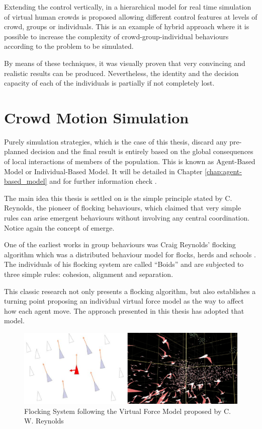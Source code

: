 Extending the control vertically, in \citep{musse2} a hierarchical model for real time simulation of virtual human crowds is proposed allowing different control features at levels of crowd, groups or individuals. This is an example of hybrid approach where it is possible to increase the complexity of crowd-group-individual behaviours according to the problem to be simulated.

By means of these techniques, it was visually proven that very convincing and realistic results can be produced. Nevertheless, the identity and the decision capacity of each of the individuals is partially if not completely lost.

\section{Crowd Motion Simulation}

Purely simulation strategies, which is the case of this thesis, discard any pre-planned decision and the final result is entirely based on the global consequences of local interactions of members of the population. This is known as Agent-Based Model or Individual-Based Model. It will be detailed in Chapter \ref{chap:agent-based_model} and for further information check  \citep{red3D}.

The main idea this thesis is settled on is the simple principle stated by C. Reynolds, the pioneer of flocking behaviours, which claimed that very simple rules can arise emergent behaviours without involving any central coordination. Notice again the concept of emerge.

One of the earliest works  in group behaviours was Craig Reynolds' flocking algorithm which was a distributed behaviour model for flocks, herds and schools \citep{reynolds}. The individuals of his flocking system are called ``Boids'' and are subjected to three simple rules: cohesion, alignment and separation.

This classic research not only presents a flocking algorithm, but also establishes a turning point proposing an individual virtual force model as the way to affect how each agent move. The approach presented in this thesis has adopted that model.

\begin{figure}[!htb]
  \centering
  \includegraphics[scale=0.65]{reynolds_flocking.eps}
  \caption[Flocking System]{Flocking System following the Virtual Force Model proposed by C. W. Reynolds \citep{reynolds}}
  \label{fig:massive}
\end{figure}

